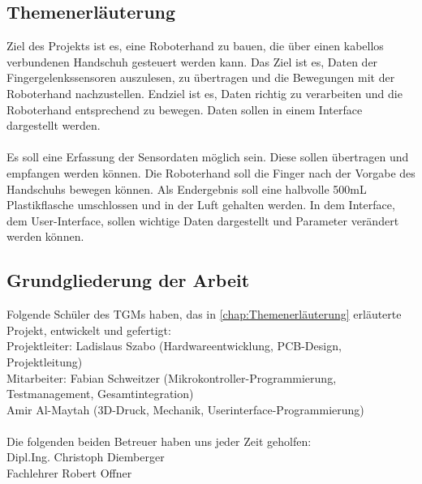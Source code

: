 \documentclass[titlepage,12pt,twoside]{article}
\begin{document}
\subsection{Themenerläuterung}
\label{chap:Themenerläuterung}
Ziel des Projekts ist es, eine Roboterhand zu bauen, die über einen kabellos verbundenen
Handschuh gesteuert werden kann. Das Ziel ist es, Daten der Fingergelenkssensoren auszulesen,
zu übertragen und die Bewegungen mit der Roboterhand nachzustellen. Endziel ist es, Daten
richtig zu verarbeiten und die Roboterhand entsprechend zu bewegen. Daten sollen in einem
Interface dargestellt werden. \\
\\
Es soll eine Erfassung der Sensordaten möglich sein. Diese sollen übertragen und empfangen
werden können. Die Roboterhand soll die Finger nach der Vorgabe des Handschuhs bewegen
können. Als Endergebnis soll eine halbvolle 500mL Plastikflasche umschlossen und in der Luft
gehalten werden. In dem Interface, dem User-Interface, sollen wichtige Daten dargestellt und
Parameter verändert werden können. \\

\subsection{Grundgliederung der Arbeit}
\label{chap:Grundgliederung der Arbeit}
Folgende Schüler des TGMs haben, das in \autoref{chap:Themenerläuterung} erläuterte Projekt, entwickelt und gefertigt: \hfill \break
\\
Projektleiter:    Ladislaus Szabo (Hardwareentwicklung, PCB-Design, Projektleitung)\\
Mitarbeiter: Fabian Schweitzer (Mikrokontroller-Programmierung, Testmanagement, Gesamtintegration)\\
Amir Al-Maytah (3D-Druck, Mechanik, Userinterface-Programmierung) 
\\
\\
Die folgenden beiden Betreuer haben uns jeder Zeit geholfen:
\\
Dipl.Ing. Christoph Diemberger \\
Fachlehrer Robert Offner
\end{document}
